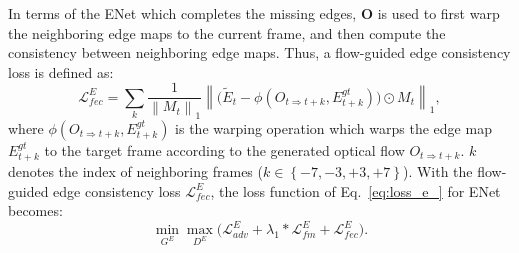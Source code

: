 In terms of the ENet which completes the missing edges, \(\boldsymbol{O}\) is used to first warp the neighboring edge maps to the current frame, and then compute the consistency between neighboring edge maps. 
%
Thus, a flow-guided edge consistency loss is defined as:
%
\begin{equation}
	\label{eq:flow_edge}
	\mathcal{L}^E_{fec}=\sum_{k}\frac{1}{\left\|M_{t} \right\|_1}\left\|\big(\widetilde{E}_{t}-\phi(O_{t\Rightarrow t+k},E_{t+k}^{gt})\big)\odot M_{t}\right\|_1,
\end{equation}
where $\phi(O_{t\Rightarrow t+k},E_{t+k}^{gt})$ is the warping operation which warps the edge map $E_{t+k}^{gt}$ to the target frame according to the generated optical flow $O_{t\Rightarrow t+k}$.
$k$ denotes the index of neighboring frames ($k\in \left\{-7,-3,+3,+7 \right\}$). 
With the flow-guided edge consistency loss $\mathcal{L}^E_{fec}$, the loss function of  Eq.~\eqref{eq:loss_e_} for ENet becomes:
\begin{equation}
\label{eq:loss_e}
\min\limits_{G^E} \max \limits_{D^E} \big(\mathcal{L}^E_{adv}+\lambda_1 * \mathcal{L}^E_{fm}+\mathcal{L}^E_{fec}\big).
\end{equation}




